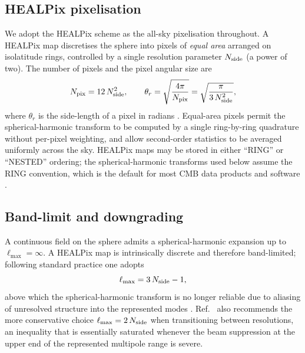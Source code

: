 \documentclass[11pt]{article}
\theoremstyle{definition}
\begin{document}
\subsection{HEALPix pixelisation}
\label{sec:healpix}

We adopt the HEALPix scheme \cite{gorski2005,zonca2019healpy} as the all-sky pixelisation throughout. A HEALPix map discretises the sphere into pixels of \emph{equal area} arranged on isolatitude rings, controlled by a single resolution parameter \(N_{\rm side}\) (a power of two). The number of pixels and the pixel angular size are
\begin{equation}
  N_{\rm pix} = 12\,N_{\rm side}^2,
  \qquad
  \theta_r = \sqrt{\frac{4\pi}{N_{\rm pix}}}
           = \sqrt{\frac{\pi}{3\,N_{\rm side}^2}},
  \label{eq:healpix_nside}
\end{equation}
where \(\theta_r\) is the side-length of a pixel in radians \cite{gorski2005,sullivan2024methods}. Equal-area pixels permit the spherical-harmonic transform to be computed by a single ring-by-ring quadrature without per-pixel weighting, and allow second-order statistics to be averaged uniformly across the sky. HEALPix maps may be stored in either ``RING'' or ``NESTED'' ordering; the spherical-harmonic transforms used below assume the RING convention, which is the default for most CMB data products and software \cite{gorski2005}.

\subsection{Band-limit and downgrading}
\label{sec:downgrade}

A continuous field on the sphere admits a spherical-harmonic expansion up to \(\ell_{\max}=\infty\). A HEALPix map is intrinsically discrete and therefore band-limited; following standard practice one adopts
\begin{equation}
  \ell_{\max} = 3\,N_{\rm side} - 1,
\end{equation}
above which the spherical-harmonic transform is no longer reliable due to aliasing of unresolved structure into the represented modes \cite{gorski2005,sullivan2024methods}. Ref.~\cite{sullivan2024methods} also recommends the more conservative choice \(\ell_{\max}=2\,N_{\rm side}\) when transitioning between resolutions, an inequality that is essentially saturated whenever the beam suppression at the upper end of the represented multipole range is severe.
\end{document}
